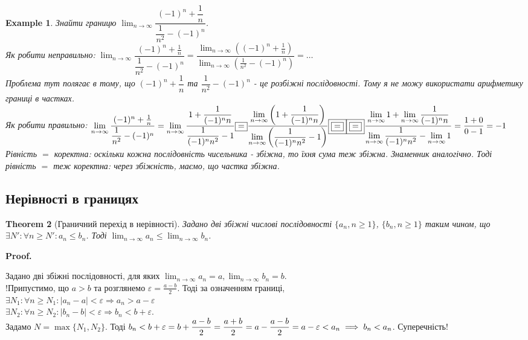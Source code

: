 \documentclass[a4paper, 14pt]{article}
\makeatletter
\def\huge{\displaystyle}
\def\qed{$\blacksquare$}
\theoremstyle{theoremdd}
\newtheorem{theorem}{Theorem}[subsection]
\theoremstyle{theoremdd}
\theoremstyle{theoremdd}
\theoremstyle{theoremdd}
\newtheorem{example}[theorem]{Example}
\theoremstyle{theoremdd}
\theoremstyle{theoremdd}
\theoremstyle{theoremdd}
\theoremstyle{theoremdd}
\renewenvironment{proof}[1][Proof.\\]{\par
\pushQED{\hfill \qed}%
\normalfont \topsep6\p@\@plus6\p@\relax
\trivlist
\item\relax
{\bfseries
#1\@addpunct{.}}\hspace\labelsep\ignorespaces
}{%
\popQED\endtrivlist\@endpefalse
}
\makeatother
\begin{document}
	\begin{example}
	Знайти границю $\huge \lim_{n \to \infty} \dfrac{(-1)^n + \dfrac{1}{n}}{\dfrac{1}{n^2}- (-1)^n}$.\\
	Як робити неправильно: $\huge \lim_{n \to \infty} \dfrac{(-1)^n + \frac{1}{n}}{\dfrac{1}{n^2}- (-1)^n} = \dfrac{\huge \lim_{n \to \infty} \left( (-1)^n + \frac{1}{n} \right) }{\huge \lim_{n \to \infty} \left( \frac{1}{n^2} - (-1)^n \right)} = \dots$\\
	Проблема тут полягає в тому, що $(-1)^n + \dfrac{1}{n}$ та $\dfrac{1}{n^2}-(-1)^n$ - це розбіжні послідовності. Тому я не можу використати арифметику границі в частках.\\
	Як робити правильно: $\huge \lim_{n \to \infty} \dfrac{(-1)^n + \frac{1}{n}}{\dfrac{1}{n^2}- (-1)^n} = \lim_{n \to \infty} \dfrac{1 + \dfrac{1}{(-1)^n n}}{\dfrac{1}{(-1)^n n^2} - 1} \boxed{=} \dfrac{\huge\lim_{n \to \infty} \left( 1 + \dfrac{1}{(-1)^n n} \right)}{\huge\lim_{n \to \infty} \left( \dfrac{1}{(-1)^n n^2} - 1 \right)} \boxed{\boxed{=}}
	\\ \boxed{\boxed{=}} \dfrac{\huge\lim_{n \to \infty} 1 + \lim_{n \to \infty} \dfrac{1}{(-1)^n n}}{\huge\lim_{n \to \infty} \dfrac{1}{(-1)^n n^2} - \lim_{n \to \infty} 1 } = \dfrac{1+0}{0-1} = -1$\\
	Рівність $\boxed{\boxed{=}}$ коректна: оскільки кожна послідовність чисельника - збіжна, то їхня сума теж збіжна. Знаменник аналогічно. Тоді рівність $\boxed{=}$ теж коректна: через збіжність, маємо, що частка збіжна.
	\end{example}
	
	\subsection{Нерівності в границях}
	\begin{theorem}[Граничний перехід в нерівності]
	Задано дві збіжні числові послідовності $\{a_n, n \geq 1\}$, $\{b_n, n \geq 1\}$ таким чином, що $\exists N': \forall n \geq N': a_n \leq b_n$. Тоді $\displaystyle \lim_{n \to \infty} a_n \leq \lim_{n \to \infty} b_n$.
	\end{theorem}
	
	\begin{proof}
	Задано дві збіжні послідовності, для яких $\displaystyle \lim_{n \to \infty} a_n =a, \lim_{n \to \infty} b_n = b$.\\
	!Припустимо, що $a>b$ та розглянемо $\displaystyle \varepsilon = \frac{a-b}{2}$. Тоді за означенням границі,\\
	$\exists N_1: \forall n \geq N_1:|a_n-a|<\varepsilon \Rightarrow a_n>a-\varepsilon$\\
	$\exists N_2: \forall n \geq N_2:|b_n-b|<\varepsilon \Rightarrow b_n<b+\varepsilon$.\\
	Задамо $N=\max \{N_1, N_2\}$. Тоді  $\displaystyle b_n < b+\varepsilon = b + \frac{a-b}{2}=\frac{a+b}{2}=a-\frac{a-b}{2} = a-\varepsilon<a_n \\ \implies b_n<a_n$. Суперечність!
	\end{proof}
	
\end{document}

